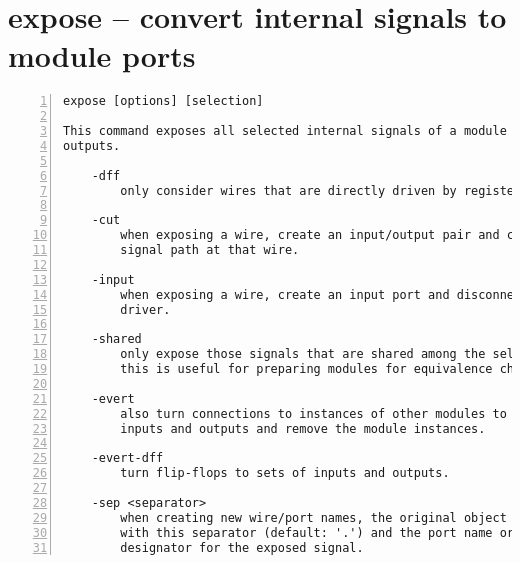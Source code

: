 \section{expose -- convert internal signals to module ports}
\label{cmd:expose}
\begin{lstlisting}[numbers=left,frame=single]
    expose [options] [selection]

This command exposes all selected internal signals of a module as additional
outputs.

    -dff
        only consider wires that are directly driven by register cell.

    -cut
        when exposing a wire, create an input/output pair and cut the internal
        signal path at that wire.

    -input
        when exposing a wire, create an input port and disconnect the internal
        driver.

    -shared
        only expose those signals that are shared among the selected modules.
        this is useful for preparing modules for equivalence checking.

    -evert
        also turn connections to instances of other modules to additional
        inputs and outputs and remove the module instances.

    -evert-dff
        turn flip-flops to sets of inputs and outputs.

    -sep <separator>
        when creating new wire/port names, the original object name is suffixed
        with this separator (default: '.') and the port name or a type
        designator for the exposed signal.
\end{lstlisting}

